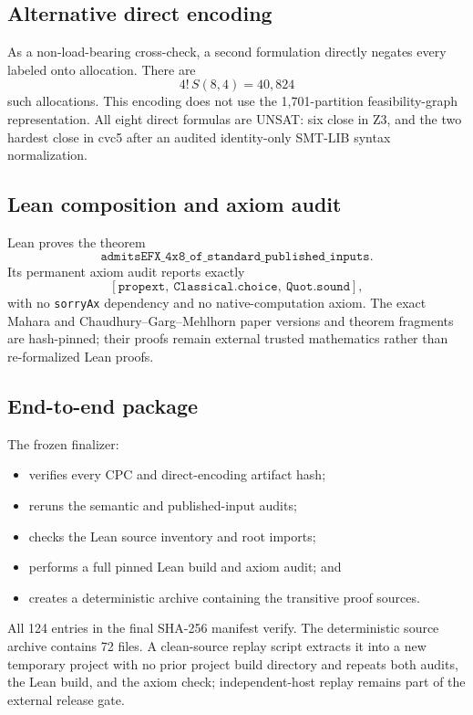 \documentclass[11pt]{article}
\theoremstyle{definition}
\begin{document}
\subsection{Alternative direct encoding}

As a non-load-bearing cross-check, a second formulation directly negates
every labeled onto allocation. There are
\[
  4!\,S(8,4)=40,824
\]
such allocations. This encoding does not use the 1,701-partition
feasibility-graph representation. All eight direct formulas are UNSAT: six
close in Z3, and the two hardest close in cvc5 after an audited identity-only
SMT-LIB syntax normalization.

\subsection{Lean composition and axiom audit}

Lean proves the theorem
\[
\texttt{admitsEFX\_4x8\_of\_standard\_published\_inputs}.
\]
Its permanent axiom audit reports exactly
\[
  [\texttt{propext},\ \texttt{Classical.choice},\ \texttt{Quot.sound}],
\]
with no \texttt{sorryAx} dependency and no native-computation axiom. The exact
Mahara and Chaudhury--Garg--Mehlhorn paper versions and theorem fragments are
hash-pinned; their proofs remain external trusted mathematics rather than
re-formalized Lean proofs.

\subsection{End-to-end package}

The frozen finalizer:
\begin{itemize}[leftmargin=1.8em]
  \item verifies every CPC and direct-encoding artifact hash;
  \item reruns the semantic and published-input audits;
  \item checks the Lean source inventory and root imports;
  \item performs a full pinned Lean build and axiom audit; and
  \item creates a deterministic archive containing the transitive proof
  sources.
\end{itemize}
All 124 entries in the final SHA-256 manifest verify. The deterministic
source archive contains 72 files. A clean-source replay script extracts it
into a new temporary project with no prior project build directory and repeats
both audits, the Lean build, and the axiom check; independent-host replay
remains part of the external release gate.
\end{document}
